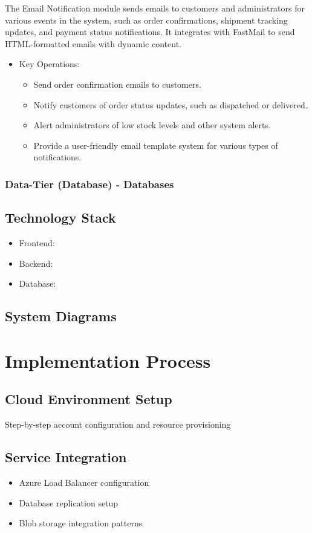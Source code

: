 \documentclass{llncs}
\begin{document}
The Email Notification module sends emails to customers and administrators for various events in the system, such as order confirmations, shipment tracking updates, and payment status notifications. It integrates with FastMail to send HTML-formatted emails with dynamic content.
\begin{itemize}
    \item Key Operations:
    \begin{itemize}   
        \item Send order confirmation emails to customers.
        \item Notify customers of order status updates, such as dispatched or delivered.
        \item Alert administrators of low stock levels and other system alerts.
        \item Provide a user-friendly email template system for various types of notifications.
    \end{itemize}   
\end{itemize}

\subsubsection{Data-Tier (Database) - Databases}
\subsection{Technology Stack}
\begin{itemize}
    \item Frontend: 
    \item Backend: 
    \item Database: 

\end{itemize}

\subsection{System Diagrams}

\section{Implementation Process}
\subsection{Cloud Environment Setup}
Step-by-step account configuration and resource provisioning

\subsection{Service Integration}
\begin{itemize}
    \item Azure Load Balancer configuration
    \item Database replication setup
    \item Blob storage integration patterns
\end{itemize}
\end{document}
